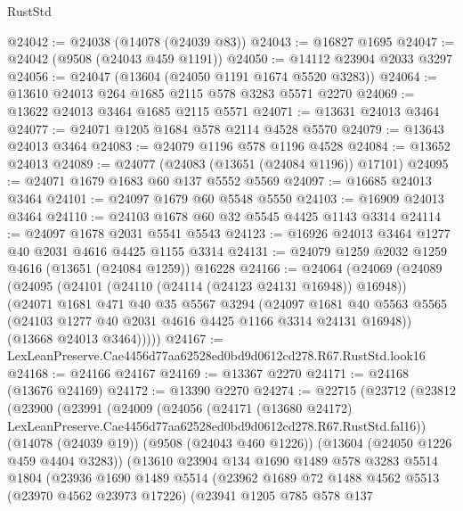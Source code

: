 \begin{lexlean}{RustStd}
\begin{coremodule}
@24042 := @24038 (@14078 (@24039 @83))
@24043 := @16827 @1695
@24047 := @24042 (@9508 (@24043 @459 @1191))
@24050 := @14112 @23904 @2033 @3297
@24056 := @24047 (@13604 (@24050 @1191 @1674 @5520 @3283))
@24064 := @13610 @24013 @264 @1685 @2115 @578 @3283 @5571 @2270
@24069 := @13622 @24013 @3464 @1685 @2115 @5571
@24071 := @13631 @24013 @3464
@24077 := @24071 @1205 @1684 @578 @2114 @4528 @5570
@24079 := @13643 @24013 @3464
@24083 := @24079 @1196 @578 @1196 @4528
@24084 := @13652 @24013
@24089 := @24077 (@24083 (@13651 (@24084 @1196)) @17101)
@24095 := @24071 @1679 @1683 @60 @137 @5552 @5569
@24097 := @16685 @24013 @3464
@24101 := @24097 @1679 @60 @5548 @5550
@24103 := @16909 @24013 @3464
@24110 := @24103 @1678 @60 @32 @5545 @4425 @1143 @3314
@24114 := @24097 @1678 @2031 @5541 @5543
@24123 := @16926 @24013 @3464 @1277 @40 @2031 @4616 @4425 @1155 @3314
@24131 := @24079 @1259 @2032 @1259 @4616 (@13651 (@24084 @1259)) @16228
@24166 := @24064
    (@24069
      (@24089
        (@24095
          (@24101 (@24110 (@24114 (@24123 @24131 @16948)) @16948))
          (@24071
            @1681
            @471
            @40
            @35
            @5567
            @3294
            (@24097
              @1681
              @40
              @5563
              @5565
              (@24103 @1277 @40 @2031 @4616 @4425 @1166 @3314 @24131 @16948))
            (@13668 @24013 @3464)))))
@24167 := LexLeanPreserve.Cae4456d77aa62528ed0bd9d0612cd278.R67.RustStd.look16
@24168 := @24166 @24167
@24169 := @13367 @2270
@24171 := @24168 (@13676 @24169)
@24172 := @13390 @2270
@24274 := @22715
    (@23712
      (@23812
        (@23900
          (@23991
            (@24009
              (@24056
                (@24171
                  (@13680 @24172)
                  LexLeanPreserve.Cae4456d77aa62528ed0bd9d0612cd278.R67.RustStd.fal16))
              (@14078 (@24039 @19))
              (@9508 (@24043 @460 @1226))
              (@13604 (@24050 @1226 @459 @4404 @3283))
              (@13610
                @23904
                @134
                @1690
                @1489
                @578
                @3283
                @5514
                @1804
                (@23936
                  @1690
                  @1489
                  @5514
                  (@23962
                    @1689
                    @72
                    @1488
                    @4562
                    @5513
                    (@23970 @4562 @23973 @17226)
                    (@23941
                      @1205
                      @785
                      @578
                      @137

\end{coremodule}
\end{lexlean}

